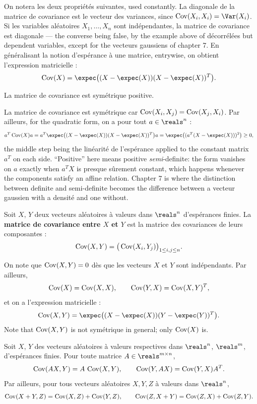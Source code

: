 On notera les deux propriétés suivantes, used constantly. La diagonale de la
matrice de covariance est le vecteur des variances, since
$\Cov(X_{i},X_{i}) = \Var(X_{i})$. Si les variables aléatoires
$X_{1},\dots,X_{n}$ sont indépendantes, la matrice de covariance est diagonale ---
the converse being false, by the example above of décorrélées but dependent
variables, except for the vecteurs gaussiens of chapter 7. En généralisant la
notion d'espérance à une matrice, entrywise, on obtient l'expression matricielle :
\[
  \Cov(X) = \expec\big((X-\expec(X))(X-\expec(X))^{T}\big).
\]

\begin{prop}
  La matrice de covariance est symétrique positive.
\end{prop}

\begin{remark}
  La matrice de covariance est symétrique car
  $\operatorname{Cov}(X_{i},X_{j}) = \operatorname{Cov}(X_{j},X_{i})$. Par ailleurs, for the quadratic form,
  on a pour tout $a \in \reals^{n}$ :
  \[
    a^{T}\Cov(X)a
      = a^{T}\expec\big((X-\expec(X))(X-\expec(X))^{T}\big)a
      = \expec\big((a^{T}(X-\expec(X)))^{2}\big) \geq 0 ,
  \]
  the middle step being the linéarité de l'espérance applied to the constant
  matrix $a^{T}$ on each side. ``Positive'' here means positive
  \emph{semi}-definite: the form vanishes on $a$ exactly when
  $a^{T}X$ is presque sûrement constant, which happens whenever the components
  satisfy an affine relation. Chapter 7 is where the distinction between
  definite and semi-definite becomes the difference between a vecteur gaussien
  with a densité and one without.
\end{remark}

\begin{definition}
  Soit $X$, $Y$ deux vecteurs aléatoires à valeurs dans $\reals^{n}$ d'espérances
  finies. La \textbf{matrice de covariance entre $X$ et $Y$} est la matrice des
  covariances de leurs composantes :
  \[
    \operatorname{Cov}(X,Y) = \big(\operatorname{Cov}(X_{i},Y_{j})\big)_{1 \leq i,j \leq n}.
  \]
\end{definition}

On note que $\operatorname{Cov}(X,Y)=0$ dès que les vecteurs $X$ et $Y$ sont indépendants. Par
ailleurs,
\[
  \operatorname{Cov}(X) = \operatorname{Cov}(X,X), \qquad \operatorname{Cov}(Y,X) = \operatorname{Cov}(X,Y)^{T},
\]
et on a l'expression matricielle :
\[
  \Cov(X,Y) = \expec\big((X-\expec(X))(Y-\expec(Y))^{T}\big).
\]
Note that $\operatorname{Cov}(X,Y)$ is not symétrique in general; only $\operatorname{Cov}(X)$ is.

\begin{prop}
  Soit $X$, $Y$ des vecteurs aléatoires à valeurs respectives dans $\reals^{n}$,
  $\reals^{m}$, d'espérances finies. Pour toute matrice
  $A \in \reals^{m \times n}$,
  \[
    \operatorname{Cov}(AX,Y) = A\,\operatorname{Cov}(X,Y),
    \qquad
    \operatorname{Cov}(Y,AX) = \operatorname{Cov}(Y,X)A^{T}.
  \]
  Par ailleurs, pour tous vecteurs aléatoires $X,Y,Z$ à valeurs dans $\reals^{n}$,
  \[
    \operatorname{Cov}(X+Y,Z) = \operatorname{Cov}(X,Z)+\operatorname{Cov}(Y,Z),
    \qquad
    \operatorname{Cov}(Z,X+Y) = \operatorname{Cov}(Z,X)+\operatorname{Cov}(Z,Y).
  \]
\end{prop}

